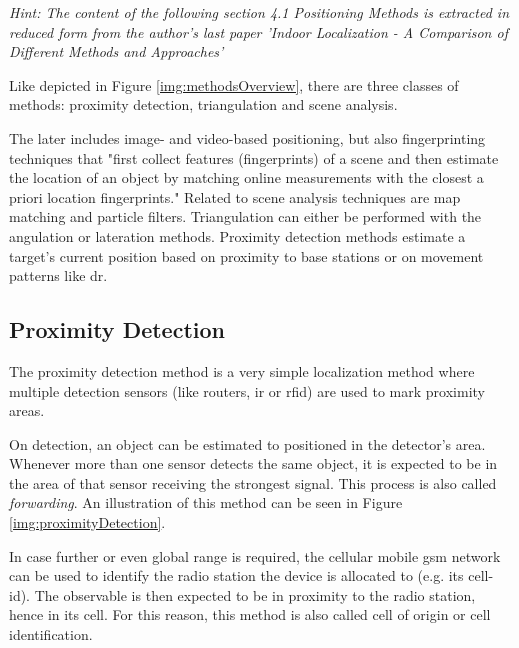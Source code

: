 \textit{Hint: The content of the following section \emph{4.1 Positioning Methods} is extracted in reduced form from the author's last paper 'Indoor Localization - A Comparison of Different Methods and Approaches' \cite{posMethods} }

Like depicted in Figure \ref{img:methodsOverview}, there are three classes of methods: proximity detection, triangulation and scene analysis. 


The later includes image- and video-based positioning, but also fingerprinting techniques that "first collect features (fingerprints) of a scene and then estimate	the location of an object by matching online measurements with the closest a priori location fingerprints." \cite{wirelessILSystemsAndTechniquesSurvey}  Related to scene analysis techniques are map matching and particle filters. Triangulation can either be performed with the angulation or lateration methods.
Proximity detection methods estimate a target's current position based on proximity to base stations or on movement patterns like \ac{dr}. 


\subsection*{Proximity Detection}

The proximity detection method is a very simple localization method where multiple detection sensors (like routers, \ac{ir} or \ac{rfid}) are used to mark proximity areas. 

On detection, an object can be estimated to positioned in the detector's area. Whenever more than one sensor detects the same object, it is expected to be in the area of that sensor receiving the strongest signal. This process is also called \textit{forwarding}.
An illustration of this method can be seen in Figure \ref{img:proximityDetection}.

In case further or even global range is required, the cellular mobile \ac{gsm} network can be used to identify the radio station the device is allocated to (e.g. its cell-id). The observable is then expected to be in proximity to the radio station, hence in its cell. %
\cite[p.5]{wirelessILSystemsAndTechniquesSurvey} For this reason, this method is also called cell of origin or cell identification.

